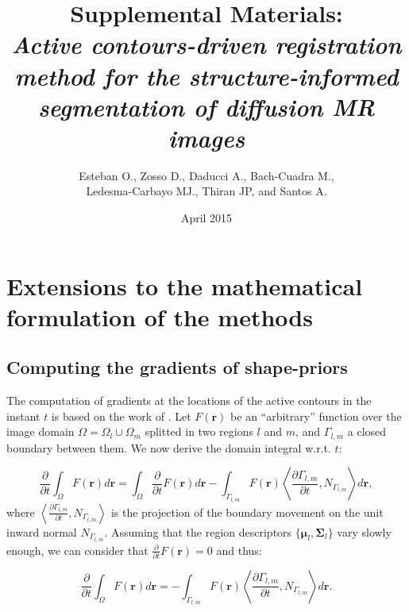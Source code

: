 \documentclass[a4paper]{report}
\renewcommand{\vec}[1]{\mathbf{#1}}
\begin{document}
\title{Supplemental Materials: \\ \emph{Active contours-driven registration method for the structure-informed segmentation of diffusion MR images}}
\author{Esteban O., Zosso D., Daducci A., Bach-Cuadra M., \\ Ledesma-Carbayo MJ., Thiran JP, and Santos A.}
\date{April 2015}

\maketitle
\section{Extensions to the mathematical formulation of the methods}\label{sec:regseg-maths_extension}

\subsection{Computing the gradients of shape-priors}\label{sec:regseg-shape_priors}
The computation of gradients at the locations of the active contours in the
  instant $t$ is based on the work of \cite{herbulot_segmentation_2006}.
Let $F(\vec{r})$ be an ``arbitrary'' function over the image domain
  $\Omega = \Omega_l \cup \Omega_m$ splitted in two regions $l$ and
  $m$, and $\Gamma_{l,m}$ a closed boundary between them.
We now derive the domain integral w.r.t. $t$:

  \begin{equation}
  \frac{\partial}{\partial t} \int_\Omega F(\vec{r}) d\vec{r} =
  \int_\Omega \frac{\partial}{\partial t}F(\vec{r}) d\vec{r}
  - \int_{\Gamma_{l,m}} F(\vec{r}) \left\langle \frac{\partial \Gamma_{l,m} }{\partial t},
  N_{\Gamma_{l,m}}\right\rangle d\vec{r},
  \end{equation}
%
  where $\left\langle\frac{\partial\Gamma_{l,m}}{\partial t}, N_{\Gamma_{l,m}}\right\rangle$ is
  the projection of the boundary movement on the unit inward normal $N_{\Gamma_{l,m}}$.
Assuming that the region descriptors $\{\boldsymbol{\mu}_l, \boldsymbol{\Sigma}_l\}$ vary slowly enough, we can consider
  that $\frac{\partial}{\partial t} F(\vec{r}) = 0$ and thus:

  \begin{equation}
  \frac{\partial}{\partial t} \int_\Omega F(\vec{r}) d\vec{r} =
  - \int_{\Gamma_{l,m}} F(\vec{r}) \left\langle \frac{\partial \Gamma_{l,m} }{\partial t},
  N_{\Gamma_{l,m}}\right\rangle d\vec{r}.
  \label{eq:regseg-shape_gradients}
  \end{equation}
\end{document}
